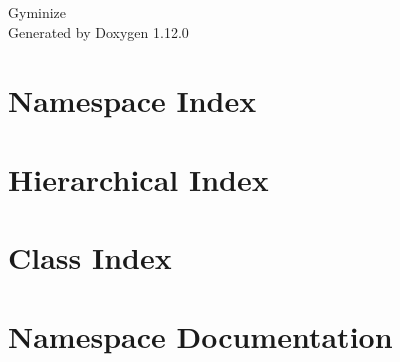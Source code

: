 \documentclass[twoside]{book}
\newcommand{\+}{\discretionary{\mbox{\scriptsize$\hookleftarrow$}}{}{}}
\newcommand{\clearemptydoublepage}{%
    \newpage{\pagestyle{empty}\cleardoublepage}%
  }
\begin{document}
  \raggedbottom
    \hypersetup{pageanchor=false,
                bookmarksnumbered=true,
                pdfencoding=unicode
               }
  \begin{titlepage}
  \vspace*{7cm}
  \begin{center}%
  {\Large Gyminize}\\
  \vspace*{1cm}
  {\large Generated by Doxygen 1.12.0}\\
  \end{center}
  \end{titlepage}
  \clearemptydoublepage
  \tableofcontents
  \clearemptydoublepage
  \hypersetup{pageanchor=true}
\chapter{Namespace Index}

\chapter{Hierarchical Index}

\chapter{Class Index}

\chapter{Namespace Documentation}






\end{document}
